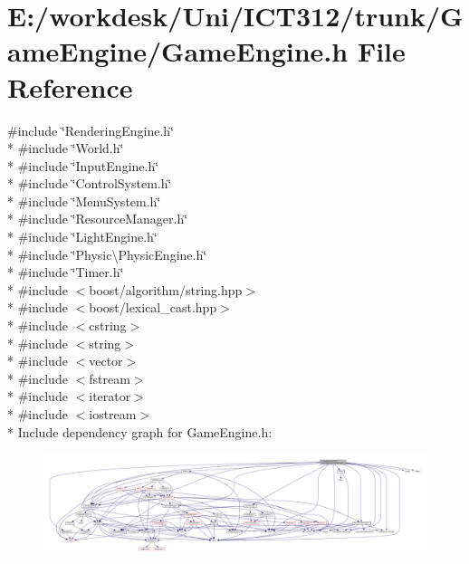 \section{E\+:/workdesk/\+Uni/\+I\+C\+T312/trunk/\+Game\+Engine/\+Game\+Engine.h File Reference}
\label{_game_engine_8h}
{\ttfamily \#include \char`\"{}Rendering\+Engine.\+h\char`\"{}}\\*
{\ttfamily \#include \char`\"{}World.\+h\char`\"{}}\\*
{\ttfamily \#include \char`\"{}Input\+Engine.\+h\char`\"{}}\\*
{\ttfamily \#include \char`\"{}Control\+System.\+h\char`\"{}}\\*
{\ttfamily \#include \char`\"{}Menu\+System.\+h\char`\"{}}\\*
{\ttfamily \#include \char`\"{}Resource\+Manager.\+h\char`\"{}}\\*
{\ttfamily \#include \char`\"{}Light\+Engine.\+h\char`\"{}}\\*
{\ttfamily \#include \char`\"{}Physic\textbackslash{}\+Physic\+Engine.\+h\char`\"{}}\\*
{\ttfamily \#include \char`\"{}Timer.\+h\char`\"{}}\\*
{\ttfamily \#include $<$boost/algorithm/string.\+hpp$>$}\\*
{\ttfamily \#include $<$boost/lexical\+\_\+cast.\+hpp$>$}\\*
{\ttfamily \#include $<$cstring$>$}\\*
{\ttfamily \#include $<$string$>$}\\*
{\ttfamily \#include $<$vector$>$}\\*
{\ttfamily \#include $<$fstream$>$}\\*
{\ttfamily \#include $<$iterator$>$}\\*
{\ttfamily \#include $<$iostream$>$}\\*
Include dependency graph for Game\+Engine.\+h\+:\nopagebreak
\begin{figure}[H]
\begin{center}
\leavevmode
\includegraphics[width=350pt]{d4/dd3/_game_engine_8h__incl}
\end{center}
\end{figure}
